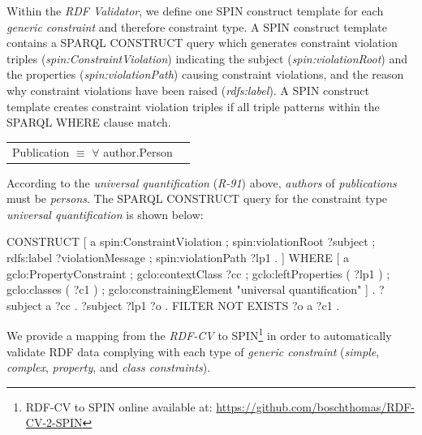 \documentclass[a4paper,fontsize=11pt]{scrartcl}
\newenvironment{DL}{
  \vspace{0cm}
	\begin{center}
  \begin{tabular}{r l}

}{
  \end{tabular}
	\end{center}
}
\begin{document}

Within the \emph{RDF Validator}, we define one SPIN construct template for each \emph{generic constraint} and therefore constraint type.
A SPIN construct template contains a SPARQL CONSTRUCT query which generates constraint violation triples (\emph{spin:ConstraintViolation}) indicating the subject (\emph{spin:violationRoot}) and the properties (\emph{spin:violationPath}) causing constraint violations, and the reason why constraint violations have been raised (\emph{rdfs:label}).
A SPIN construct template creates constraint violation triples if all triple patterns within the SPARQL WHERE clause match.

\begin{DL}
Publication $\equiv$ $\forall$ author.Person
\end{DL}

According to the \emph{universal quantification} (\emph{R-91}) above, \emph{authors} of \emph{publications} must be \emph{persons}.
The SPARQL CONSTRUCT query for the constraint type \emph{universal quantification} is shown below:

\begin{ex}
CONSTRUCT {
    [   a spin:ConstraintViolation ; spin:violationRoot ?subject ;
        rdfs:label ?violationMessage ; spin:violationPath ?lp1 . ] }
WHERE {	  
    [   a gclo:PropertyConstraint ;
        gclo:contextClass ?cc ;
        gclo:leftProperties ( ?lp1 ) ;
        gclo:classes ( ?c1 ) ;
        gclo:constrainingElement "universal quantification" ] .
    ?subject a ?cc .
    ?subject ?lp1 ?o .
    FILTER NOT EXISTS { ?o a ?c1 } . }
\end{ex}

We provide a mapping from the \emph{RDF-CV} to SPIN\footnote{RDF-CV to SPIN online available at: \url{https://github.com/boschthomas/RDF-CV-2-SPIN}} 
in order to automatically validate RDF data complying with each type of \emph{generic constraint} (\emph{simple}, \emph{complex}, \emph{property}, and \emph{class constraints}).

\end{document}
